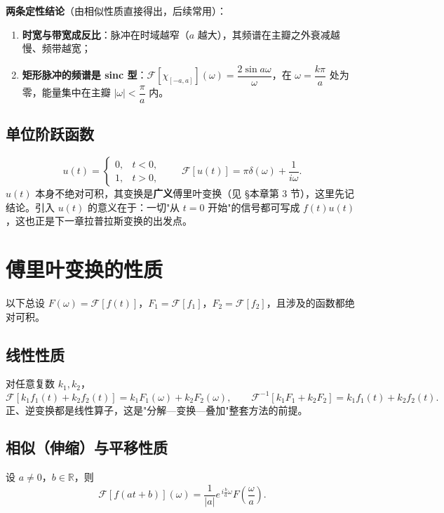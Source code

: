 \textbf{两条定性结论}（由相似性质直接得出，后续常用）：
\begin{enumerate}
    \item \textbf{时宽与带宽成反比}：脉冲在时域越窄（\(a\) 越大），其频谱在主瓣之外衰减越慢、频带越宽；
    \item \textbf{矩形脉冲的频谱是 sinc 型}：\(\mathscr{F}\left[\chi_{[-a,a]}\right](\omega)=\dfrac{2\sin a\omega}{\omega}\)，在 \(\omega=\dfrac{k\pi}{a}\) 处为零，能量集中在主瓣 \(|\omega|<\dfrac{\pi}{a}\) 内。
\end{enumerate}

\subsection{单位阶跃函数}

\[
u(t)=
\begin{cases}
0, & t<0,\\
1, & t>0,
\end{cases}
\qquad
\mathscr{F}[u(t)]=\pi\delta(\omega)+\frac{1}{i\omega}.
\]
\(u(t)\) 本身不绝对可积，其变换是\textbf{广义}傅里叶变换（见 \S 本章第 3 节），这里先记结论。引入 \(u(t)\) 的意义在于：一切"从 \(t=0\) 开始"的信号都可写成 \(f(t)u(t)\)，这也正是下一章拉普拉斯变换的出发点。

\section{傅里叶变换的性质}

以下总设 \(F(\omega)=\mathscr{F}[f(t)]\)，\(F_1=\mathscr{F}[f_1]\)，\(F_2=\mathscr{F}[f_2]\)，且涉及的函数都绝对可积。

\subsection{线性性质}

对任意复数 \(k_1,k_2\)，
\[
\mathscr{F}[k_1f_1(t)+k_2f_2(t)]=k_1F_1(\omega)+k_2F_2(\omega),
\qquad
\mathscr{F}^{-1}[k_1F_1+k_2F_2]=k_1f_1(t)+k_2f_2(t).
\]
正、逆变换都是线性算子，这是"分解—变换—叠加"整套方法的前提。

\subsection{相似（伸缩）与平移性质}

设 \(a\neq0\)，\(b\in\mathbb{R}\)，则
\begin{equation}
\mathscr{F}[f(at+b)](\omega)=\frac{1}{|a|}e^{\,i\frac{b}{a}\omega}F\!\left(\frac{\omega}{a}\right).
\label{eq:similar}
\end{equation}

